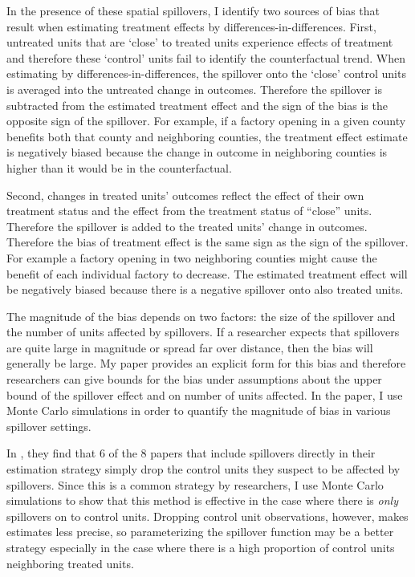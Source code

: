 \documentclass[11pt]{article}
\begin{document}
In the presence of these spatial spillovers, I identify two sources of bias that result when estimating treatment effects by differences-in-differences. First, untreated units that are `close' to treated units experience effects of treatment and therefore these `control' units fail to identify the counterfactual trend. When estimating by differences-in-differences, the spillover onto the `close' control units is averaged into the untreated change in outcomes. Therefore the spillover is subtracted from the estimated treatment effect and the sign of the bias is the opposite sign of the spillover. For example, if a factory opening in a given county benefits both that county and neighboring counties, the treatment effect estimate is negatively biased because the change in outcome in neighboring counties is higher than it would be in the counterfactual. 

Second, changes in treated units' outcomes reflect the effect of their own treatment status and the effect from the treatment status of ``close'' units. Therefore the spillover is added to the treated units' change in outcomes. Therefore the bias of treatment effect is the same sign as the sign of the spillover. For example a factory opening in two neighboring counties might cause the benefit of each individual factory to decrease. The estimated treatment effect will be negatively biased because there is a negative spillover onto also treated units. 

The magnitude of the bias depends on two factors: the size of the spillover and the number of units affected by spillovers. If a researcher expects that spillovers are quite large in magnitude or spread far over distance, then the bias will generally be large. My paper provides an explicit form for this bias and therefore researchers can give bounds for the bias under assumptions about the upper bound of the spillover effect and on number of units affected. In the paper, I use Monte Carlo simulations in order to quantify the magnitude of bias in various spillover settings. 

In \citet{Berg_Streitz_2019}, they find that 6 of the 8 papers that include spillovers directly in their estimation strategy simply drop the control units they suspect to be affected by spillovers. Since this is a common strategy by researchers, I use Monte Carlo simulations to show that this method is effective in the case where there is \textit{only} spillovers on to control units. Dropping control unit observations, however, makes estimates less precise, so parameterizing the spillover function may be a better strategy especially in the case where there is a high proportion of control units neighboring treated units.
\end{document}

